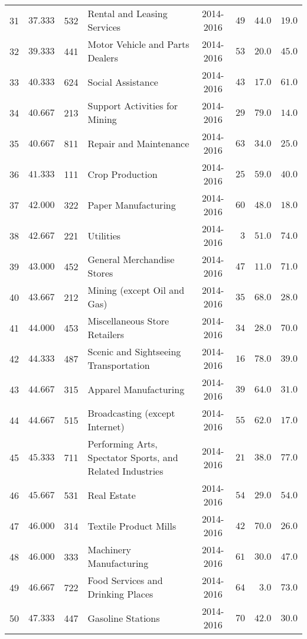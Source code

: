 \documentclass[9pt, oneside]{article}   	%
\begin{document}
\begin{longtable}{cccp{2.0in}cccc}
31  & $37.333$ & 532 & Rental and Leasing Services & 2014-2016 & $49$ & $44.0$ & $19.0$ \\
32  & $39.333$ & 441 & Motor Vehicle and Parts Dealers & 2014-2016 & $53$ & $20.0$ & $45.0$ \\
33  & $40.333$ & 624 & Social Assistance & 2014-2016 & $43$ & $17.0$ & $61.0$ \\
34  & $40.667$ & 213 & Support Activities for Mining & 2014-2016 & $29$ & $79.0$ & $14.0$ \\
35  & $40.667$ & 811 & Repair and Maintenance & 2014-2016 & $63$ & $34.0$ & $25.0$ \\
36  & $41.333$ & 111 & Crop Production & 2014-2016 & $25$ & $59.0$ & $40.0$ \\
37  & $42.000$ & 322 & Paper Manufacturing & 2014-2016 & $60$ & $48.0$ & $18.0$ \\
38  & $42.667$ & 221 & Utilities & 2014-2016 & $\phantom{0}3$ & $51.0$ & $74.0$ \\
39  & $43.000$ & 452 & General Merchandise Stores & 2014-2016 & $47$ & $11.0$ & $71.0$ \\
40  & $43.667$ & 212 & Mining (except Oil and Gas) & 2014-2016 & $35$ & $68.0$ & $28.0$ \\
41  & $44.000$ & 453 & Miscellaneous Store Retailers & 2014-2016 & $34$ & $28.0$ & $70.0$ \\
42  & $44.333$ & 487 & Scenic and Sightseeing Transportation & 2014-2016 & $16$ & $78.0$ & $39.0$ \\
43  & $44.667$ & 315 & Apparel Manufacturing & 2014-2016 & $39$ & $64.0$ & $31.0$ \\
44  & $44.667$ & 515 & Broadcasting (except Internet) & 2014-2016 & $55$ & $62.0$ & $17.0$ \\
45  & $45.333$ & 711 & Performing Arts, Spectator Sports, and Related Industries & 2014-2016 & $21$ & $38.0$ & $77.0$ \\
46  & $45.667$ & 531 & Real Estate & 2014-2016 & $54$ & $29.0$ & $54.0$ \\
47  & $46.000$ & 314 & Textile Product Mills & 2014-2016 & $42$ & $70.0$ & $26.0$ \\
48  & $46.000$ & 333 & Machinery Manufacturing & 2014-2016 & $61$ & $30.0$ & $47.0$ \\
49  & $46.667$ & 722 & Food Services and Drinking Places & 2014-2016 & $64$ & $\phantom{0}3.0$ & $73.0$ \\
50  & $47.333$ & 447 & Gasoline Stations & 2014-2016 & $70$ & $42.0$ & $30.0$ \\

\end{longtable}
\end{document}
